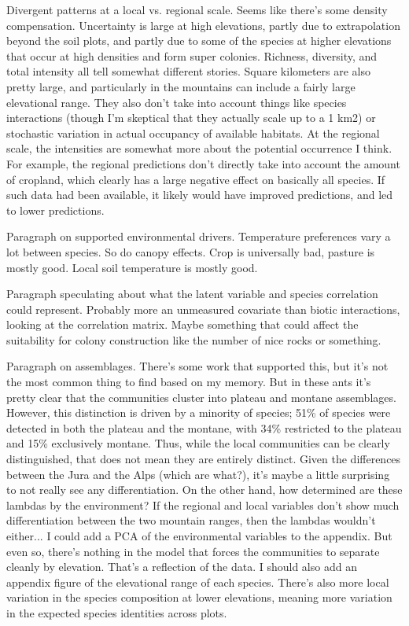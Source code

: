\documentclass[preprint,review,times,12pt,3p]{elsarticle}
\begin{document}
Divergent patterns at a local vs. regional scale. Seems like there's some density compensation. Uncertainty is large at high elevations, partly due to extrapolation beyond the soil plots, and partly due to some of the species at higher elevations that occur at high densities and form super colonies. Richness, diversity, and total intensity all tell somewhat different stories. Square kilometers are also pretty large, and particularly in the mountains can include a fairly large elevational range. They also don't take into account things like species interactions (though I'm skeptical that they actually scale up to a 1 km2) or stochastic variation in actual occupancy of available habitats. At the regional scale, the intensities are somewhat more about the potential occurrence I think. For example, the regional predictions don't directly take into account the amount of cropland, which clearly has a large negative effect on basically all species. If such data had been available, it likely would have improved predictions, and led to lower predictions.

Paragraph on supported environmental drivers. Temperature preferences vary a lot between species. So do canopy effects. Crop is universally bad, pasture is mostly good. Local soil temperature is mostly good. 

Paragraph speculating about what the latent variable and species correlation could represent. Probably more an unmeasured covariate than biotic interactions, looking at the correlation matrix. Maybe something that could affect the suitability for colony construction like the number of nice rocks or something.

Paragraph on assemblages. There's some work that supported this, but it's not the most common thing to find based on my memory. But in these ants it's pretty clear that the communities cluster into plateau and montane assemblages. However, this distinction is driven by a minority of species; 51\% of species were detected in both the plateau and the montane, with 34\% restricted to the plateau and 15\% exclusively montane. Thus, while the local communities can be clearly distinguished, that does not mean they are entirely distinct. Given the differences between the Jura and the Alps (which are what?), it's maybe a little surprising to not really see any differentiation. On the other hand, how determined are these lambdas by the environment? If the regional and local variables don't show much differentiation between the two mountain ranges, then the lambdas wouldn't either... I could add a PCA of the environmental variables to the appendix. But even so, there's nothing in the model that forces the communities to separate cleanly by elevation. That's a reflection of the data. I should also add an appendix figure of the elevational range of each species. There's also more local variation in the species composition at lower elevations, meaning more variation in the expected species identities across plots. 
\end{document}
